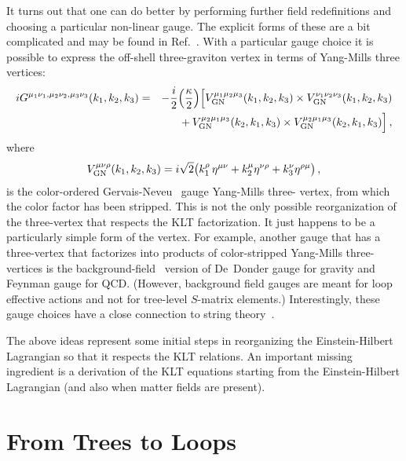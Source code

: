 It turns out that one can do better by performing further field
redefinitions and choosing a particular non-linear gauge.  The
explicit forms of these are a bit complicated and may be found in
Ref.~\cite{BernGrant}.  With a particular gauge choice it is possible
to express the off-shell three-graviton vertex in terms of Yang-Mills
three vertices:
%
\begin{eqnarray}
i G^{\mu_1 \nu_1, \mu_2\nu_2, \mu_3\nu_3}(k_1, k_2 , k_3)
& = &- {i \over 2} 
\Bigl( {\kappa \over 2} \Bigr)
\Bigl[
V_{\rm GN}^{\mu_1 \mu_2 \mu_3}(k_1, k_2, k_3) 
\times V_{\rm GN}^{\nu_1 \nu_2 \nu_3}(k_1, k_2, k_3) \nonumber \\
&&  \null
+ V_{\rm GN}^{\mu_2 \mu_1 \mu_3}(k_2, k_1, k_3) \times 
  V_{\rm GN}^{\mu_2 \mu_1 \mu_3}(k_2, k_1, k_3) \Bigr]\,, 
\label{BernGrantVertex}
\end{eqnarray}
%
where
%
\begin{equation}
 V^{\mu\nu\rho}_{\rm GN}(k_1,k_2,k_3) = 
       i\sqrt{2}  \bigl( k_1^\rho \, \eta^{\mu\nu}
            + k_2^\mu \eta^{\nu\rho} + k_3^\nu \eta^{\rho\mu} \bigr)\,,
\end{equation}
%
is the color-ordered Gervais-Neveu~\cite{GN} gauge Yang-Mills three-
vertex, from which the color factor has been stripped.  This is not
the only possible reorganization of the three-vertex that respects
the KLT factorization.  It just happens to be a particularly simple
form of the vertex.  For example, another gauge that has a three-vertex 
that factorizes into products of color-stripped Yang-Mills
three-vertices is the
background-field~\cite{tHooft75,DeWitt81,Background} version of
De~Donder gauge for gravity and Feynman gauge for QCD.  (However,
background field gauges are meant for loop effective actions and not
for tree-level $S$-matrix elements.)  Interestingly, these gauge
choices have a close connection to string theory~\cite{GN,Mapping}.

The above ideas represent some initial steps in reorganizing the
Einstein-Hilbert Lagrangian so that it respects the KLT relations.  An
important missing ingredient is a derivation of the KLT equations
starting from the Einstein-Hilbert Lagrangian (and also when matter
fields are present).

\newpage

\section{From Trees to Loops}
\label{section:trees_to_loops}

